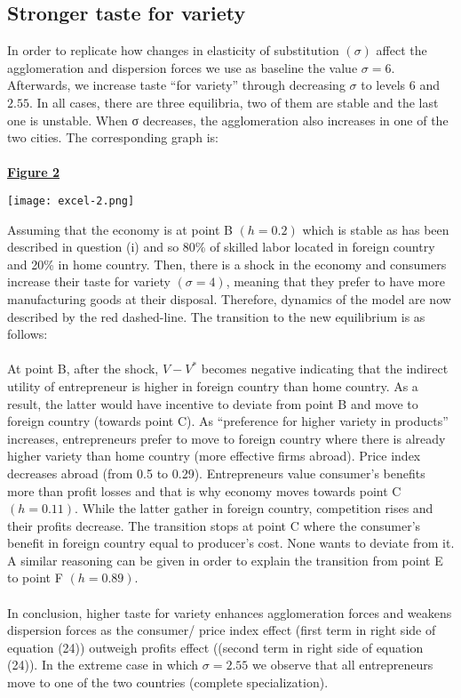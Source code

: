 \documentclass[11pt]{article}
\begin{document}
	\subsection{Stronger taste for variety}
	In order to replicate how changes in elasticity of substitution $(\sigma)$ affect the agglomeration and dispersion forces we use as baseline the value $\sigma=6$. Afterwards, we increase taste ``for variety'' through decreasing $\sigma$ to levels $6$ and $2.55$. In all cases, there are three equilibria, two of them are stable and the last one is unstable. When σ decreases, the agglomeration also increases in one of the two cities. The corresponding graph is:
\\
\\
\underline{\Large{\textbf{Figure 2}}}
\begin{center}
\texttt{[image: excel-2.png]}
\end{center}
Assuming that the economy is at point B $(h=0.2)$ which is stable as has been described in question (i) and so 80\% of skilled labor located in foreign country and 20\% in home country. Then, there is a shock in the economy and consumers increase their taste for variety $(\sigma=4)$, meaning that they prefer to have more manufacturing goods at their disposal. Therefore, dynamics of the model are now described by the red dashed-line. The transition to the new equilibrium is as follows: \\
\\
At point B, after the shock,  $V-V^{\ast}$ becomes negative indicating that the indirect utility of entrepreneur is higher in foreign country than home country. As a result, the latter would have incentive to deviate from point B and move to foreign country (towards point C). As ``preference for higher variety in products'' increases, entrepreneurs prefer to move to foreign country where there is already higher variety than home country (more effective firms abroad). Price index decreases abroad (from 0.5 to 0.29). Entrepreneurs value consumer’s benefits more than profit losses and that is why economy moves towards point C $(h=0.11)$. While the latter gather in foreign country, competition rises and their profits decrease. The transition stops at point C where the consumer’s benefit in foreign country equal to producer’s cost. None wants to deviate from it. A similar reasoning can be given in order to explain the transition from point E to point F $(h=0.89)$. \\
\\
In conclusion, higher taste for variety enhances agglomeration forces and weakens dispersion forces as the consumer/ price index effect (first term in right side of equation (24)) outweigh profits effect ((second term in right side of equation (24)). In the extreme case in which $\sigma=2.55$ we observe that all entrepreneurs move to one of the two countries (complete specialization). \\
\end{document}
